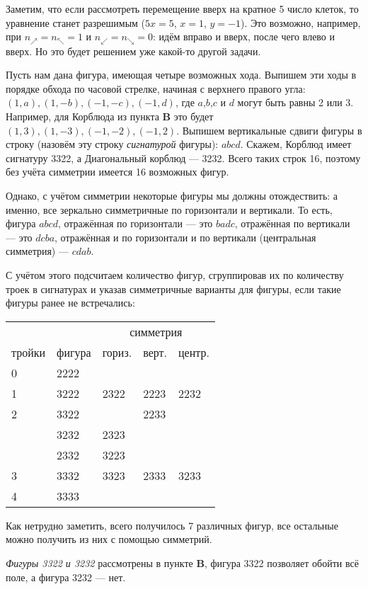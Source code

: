 \begin{itemize}
Заметим, что если рассмотреть перемещение вверх на кратное 5 число клеток, то 
уравнение станет разрешимым ($5x = 5$, $x=1$, $y=-1$). Это возможно, например,
при $n_\nearrow = n_\nwarrow = 1$ и $n_\swarrow = n_\searrow = 0$: идём вправо и вверх,
после чего влево и вверх. Но это будет решением уже какой-то другой задачи.

\itC Пусть нам дана фигура, имеющая четыре возможных хода. Выпишем эти ходы
в порядке обхода по часовой стрелке, начиная с верхнего правого угла:
$(1,a),(1,-b),(-1,-c),(-1,d)$, где $a$,$b$,$c$ и $d$ могут быть равны 2 или 3. 
Например, для Корблюда из пункта {\bfseries B} это будет $(1,3),(1,-3),(-1,-2),(-1,2)$.
Выпишем вертикальные сдвиги фигуры в строку (назовём эту строку \emph{сигнатурой} фигуры):
$abcd$. Скажем, Корблюд имеет сигнатуру 3322, а Диагональный корблюд --- 3232. 
Всего таких строк 16, поэтому без учёта симметрии имеется 16 возможных фигур.

Однако, с учётом симметрии некоторые фигуры мы должны отождествить: а именно, все зеркально
симметричные по горизонтали и вертикали. То есть, фигура $abcd$, отражённая по горизонтали --- 
это $badc$, отражённая по вертикали --- это $dcba$, отражённая и по горизонтали и по 
вертикали (центральная симметрия) --- $cdab$.

С учётом этого подсчитаем количество фигур, сгруппировав их по количеству троек в сигнатурах
и указав симметричные варианты для фигуры, если такие фигуры ранее не встречались:

\begin{center}\begin{tabular}{lllll}
       &        & \multicolumn{3}{c}{симметрия}\\\cline{3-5}
тройки & фигура & гориз. & верт. & центр.\\
\hline
0 & 2222                       \\
1 & 3222 & 2322 & 2223 & 2232\\
2 & 3322 &      & 2233 & \\
  & 3232 & 2323 & & \\
  & 2332 & 3223 & & \\
3 & 3332 & 3323 & 2333 & 3233 \\
4 & 3333 & 
\end{tabular}\end{center}

Как нетрудно заметить, всего получилось 7 различных фигур, все остальные можно получить из них с помощью симметрий.

\emph{Фигуры 3322 и 3232} рассмотрены в пункте {\bfseries B}, фигура 3322 позволяет обойти всё поле, а 
фигура 3232 --- нет. 


\end{itemize}
